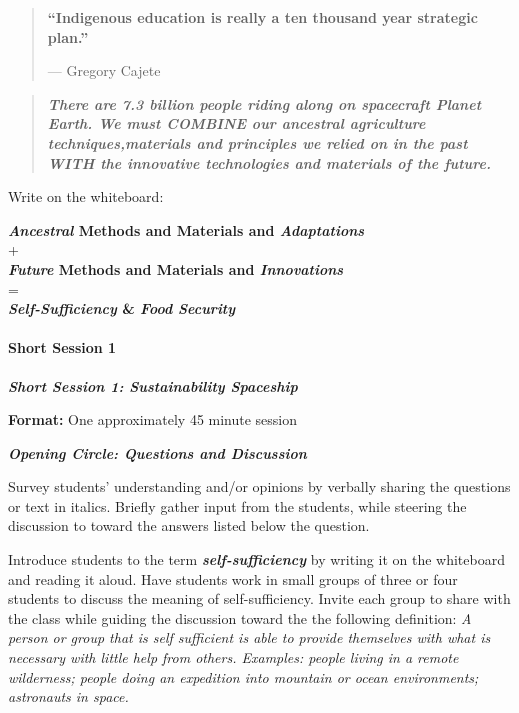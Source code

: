 \documentclass[12pt,]{article}
\let\oldparagraph\paragraph
\renewcommand{\paragraph}[1]{\oldparagraph{#1}\mbox{}}
\begin{document}
\begin{quote}
\textbf{``Indigenous education is really a ten thousand year strategic plan.''}

--- Gregory Cajete
\end{quote}

\begin{quote}
\textbf{\emph{There are 7.3 billion people riding along on spacecraft Planet Earth.
We must COMBINE our ancestral agriculture techniques,materials and
principles we relied on in the past WITH the innovative technologies and
materials of the future.}}
\end{quote}

Write on the whiteboard:

\textbf{\emph{Ancestral} Methods and Materials and \emph{Adaptations}}\\
+\\
\textbf{\emph{Future} Methods and Materials and \emph{Innovations}}\\
=\\
\textbf{\emph{Self-Sufficiency} \& \emph{Food Security}}

\hypertarget{short-session-1-1}{%
\paragraph{Short Session 1}\label{short-session-1-1}}

\textbf{\emph{Short Session 1: Sustainability Spaceship}}

\textbf{Format:} One approximately 45 minute session

\textbf{\emph{Opening Circle: Questions and Discussion}}

Survey students' understanding and/or opinions by verbally sharing the
questions or text in italics. Briefly gather input from the students,
while steering the discussion to toward the answers listed below the
question.

Introduce students to the term \textbf{\emph{self-sufficiency}} by writing
it on the whiteboard and reading it aloud. Have students work in
small groups of three or four students to discuss the meaning of
self-sufficiency. Invite each group to share with the class while
guiding the discussion toward the the following definition: \emph{A
person or group that is self sufficient is able to provide
themselves with what is necessary with little help from others.
Examples: people living in a remote wilderness; people doing an
expedition into mountain or ocean environments; astronauts in
space.}
\end{document}
